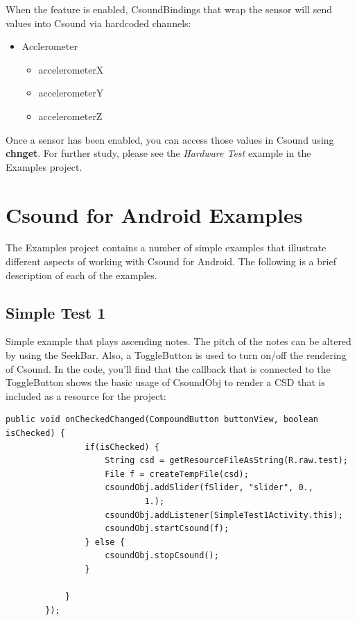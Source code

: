 \documentclass[11pt]{article}
\begin{document}
When the feature is enabled, CsoundBindings that wrap the sensor will send values into Csound via hardcoded channels:

\begin{itemize}

\item Acclerometer
\begin{itemize}
\item accelerometerX
\item accelerometerY
\item accelerometerZ
\end{itemize}

\end{itemize} 

Once a sensor has been enabled, you can access those values in Csound using \textbf{chnget}. For further study, please see the \emph{Hardware Test} example in the Examples project. 


\section{Csound for Android Examples}

The Examples project contains a number of simple examples that illustrate different aspects of working with Csound for Android.  The following is a brief description of each of the examples.

\subsection{Simple Test 1}

Simple example that plays ascending notes.  The pitch of the notes can be altered by using the SeekBar.  Also, a ToggleButton is used to turn on/off the rendering of Csound.  In the code, you'll find that the callback that is connected to the ToggleButton shows the basic usage of CsoundObj to render a CSD that is included as a resource for the project:

\begin{lstlisting}[caption=Example code showing configuring and starting a CsoundObj]
public void onCheckedChanged(CompoundButton buttonView, boolean isChecked) {
				if(isChecked) {
					String csd = getResourceFileAsString(R.raw.test);
					File f = createTempFile(csd);
					csoundObj.addSlider(fSlider, "slider", 0.,
							1.);
					csoundObj.addListener(SimpleTest1Activity.this);
					csoundObj.startCsound(f);
				} else {
					csoundObj.stopCsound();
				}
				
			}
		});
\end{lstlisting}
\end{document}
